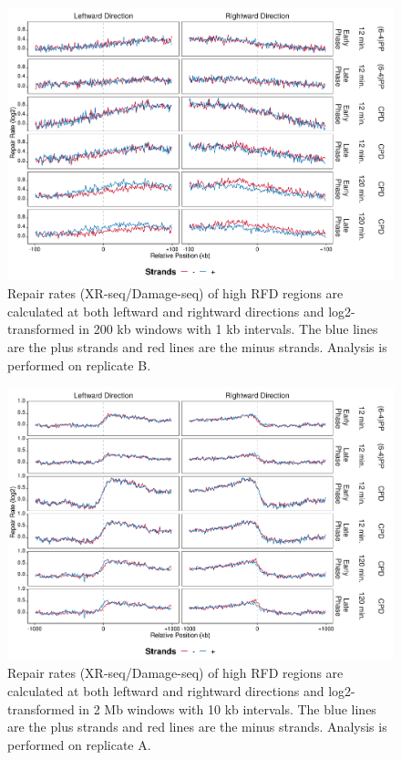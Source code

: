\begin{figure}[H]
\begin{center}
\includegraphics[width=\textwidth]{Chapters/7_appendix/figures/supfig65}
\caption[Repair rate of high RFDs in 200 kb (replicate B).]{Repair rates (XR-seq/Damage-seq) of high RFD regions are calculated at both leftward and rightward directions and log2-transformed in 200 kb windows with 1 kb intervals. The blue lines are the plus strands and red lines are the minus strands. Analysis is performed on replicate B.}
\label{supfig:rr200rfdB}
\end{center}
\end{figure}

\begin{figure}[H]
\begin{center}
\includegraphics[width=\textwidth]{Chapters/7_appendix/figures/supfig66}
\caption[Repair rate of high RFDs in 2 Mb (replicate A).]{Repair rates (XR-seq/Damage-seq) of high RFD regions are calculated at both leftward and rightward directions and log2-transformed in 2 Mb windows with 10 kb intervals. The blue lines are the plus strands and red lines are the minus strands. Analysis is performed on replicate A.}
\label{supfig:rr2000rfdA}
\end{center}
\end{figure}


